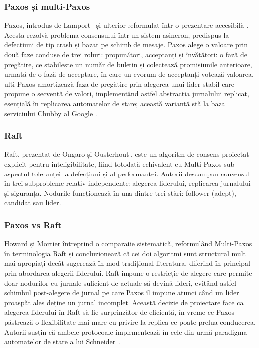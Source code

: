 \subsubsection{Paxos și multi-Paxos}

Paxos, introdus de Lamport~\cite{lamport1998} și ulterior reformulat într-o prezentare accesibilă \cite{lamport2001}. Acesta rezolvă problema consensului într-un sistem asincron, predispus la defecțiuni de tip crash și bazat pe schimb de mesaje. Paxos alege o valoare prin două faze conduse de trei roluri: propunători, acceptanți și învățători: o fază de pregătire, ce stabilește un număr de buletin și colectează promisiunile anterioare, urmată de o fază de acceptare, în care un cvorum de acceptanți votează valoarea. ulti-Paxos amortizează faza de pregătire prin alegerea unui lider stabil care propune o secvență de valori, implementând astfel abstracția jurnalului replicat, esențială în replicarea automatelor de stare; această variantă stă la baza serviciului Chubby al Google \cite{chandra2007}.

\subsubsection{Raft}

Raft, prezentat de Ongaro și Ousterhout \cite{ongaro2014}, este un algoritm de consens proiectat explicit pentru inteligibilitate, fiind totodată echivalent cu Multi-Paxos sub aspectul toleranței la defecțiuni și al performanței. Autorii descompun consensul în trei subprobleme relativ independente: alegerea liderului, replicarea jurnalului și siguranța. Nodurile funcționează în una dintre trei stări: follower (adept), candidat sau lider.

\subsubsection{Paxos vs Raft}

Howard și Mortier \cite{howard2020} întreprind o comparație sistematică, reformulând Multi-Paxos în terminologia Raft și concluzionează că cei doi algoritmi sunt structural mult mai apropiați decât sugerează în mod tradițional literatura, diferind în principal prin abordarea alegerii liderului. Raft impune o restricție de alegere care permite doar nodurilor cu jurnale suficient de actuale să devină lideri, evitând astfel schimbul post-alegere de jurnal pe care Paxos îl impune atunci când un lider proaspăt ales deține un jurnal incomplet. Această decizie de proiectare face ca alegerea liderului în Raft să fie surprinzător de eficientă, în vreme ce Paxos păstrează o flexibilitate mai mare cu privire la replica ce poate prelua conducerea. Autorii susțin că ambele protocoale implementează în cele din urmă paradigma automatelor de stare a lui Schneider~\cite{schneider1990}.

